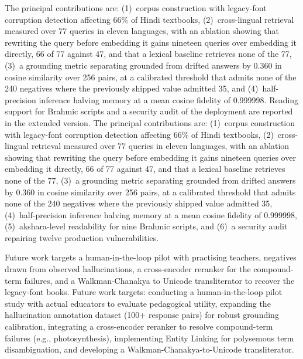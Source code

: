 \ifconf
The principal contributions are: (1)~corpus construction with legacy-font corruption detection affecting 66\% of Hindi textbooks, (2)~cross-lingual retrieval measured over 77 queries in eleven languages, with an ablation showing that rewriting the query before embedding it gains nineteen queries over embedding it directly, 66 of 77 against 47, and that a lexical baseline retrieves none of the 77, (3)~a grounding metric separating grounded from drifted answers by 0.360 in cosine similarity over 256 pairs, at a calibrated threshold that admits none of the 240 negatives where the previously shipped value admitted 35, and (4)~half-precision inference halving memory at a mean cosine fidelity of 0.999998. Reading support for Brahmic scripts and a security audit of the deployment are reported in the extended version.
\else
The principal contributions are: (1)~corpus construction with legacy-font corruption detection affecting 66\% of Hindi textbooks, (2)~cross-lingual retrieval measured over 77 queries in eleven languages, with an ablation showing that rewriting the query before embedding it gains nineteen queries over embedding it directly, 66 of 77 against 47, and that a lexical baseline retrieves none of the 77, (3)~a grounding metric separating grounded from drifted answers by 0.360 in cosine similarity over 256 pairs, at a calibrated threshold that admits none of the 240 negatives where the previously shipped value admitted 35, (4)~half-precision inference halving memory at a mean cosine fidelity of 0.999998, (5)~akshara-level readability for nine Brahmic scripts, and (6)~a security audit repairing twelve production vulnerabilities.
\fi

\ifconf
Future work targets a human-in-the-loop pilot with practising teachers, negatives drawn from observed hallucinations, a cross-encoder reranker for the compound-term failures, and a Walkman-Chanakya to Unicode transliterator to recover the legacy-font books.
\else
Future work targets: conducting a human-in-the-loop pilot study with actual educators to evaluate pedagogical utility, expanding the hallucination annotation dataset (100+ response pairs) for robust grounding calibration, integrating a cross-encoder reranker to resolve compound-term failures (e.g., photosynthesis), implementing Entity Linking for polysemous term disambiguation, and developing a Walkman-Chanakya-to-Unicode transliterator.
\fi

